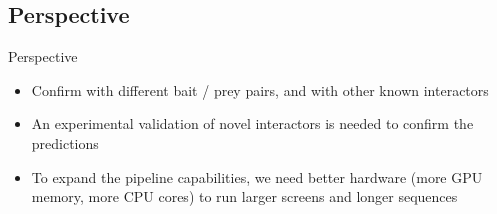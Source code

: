 \documentclass[aspectratio=169]{beamer}
\newcommand{\currentsubsectionname}{}
\let\origsubsection\subsection
\renewcommand{\subsection}[1]{\origsubsection{#1}\gdef\currentsubsectionname{#1}}
\begin{document}
\subsection{Perspective}
\begin{frame}{Perspective}
  \begin{itemize}
    \item Confirm with different bait / prey pairs, and with other known interactors
    \item  An experimental validation of novel interactors is needed to confirm the predictions
    \item To expand the pipeline capabilities, we need better hardware (more GPU memory, more CPU cores) to run larger screens and longer sequences
  \end{itemize}
\end{frame}
\end{document}
